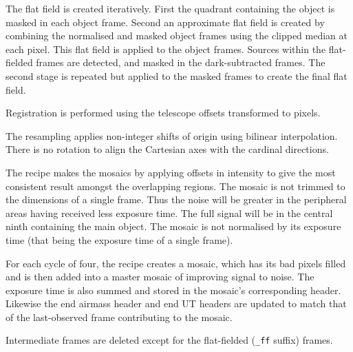 \documentclass[twoside,11pt,nolof]{starlink}
\begin{document}
{{{         \sstitem
         The flat field is created iteratively.  First the quadrant
         containing the object is masked in each object frame.  Second an
         approximate flat field is created by combining the normalised
         and masked object frames using the clipped median at each pixel.
         This flat field is applied to the object frames.  Sources within
         the flat-fielded frames are detected, and masked in the
         dark-subtracted frames.  The second stage is repeated but applied
         to the masked frames to create the final flat field.

         \sstitem
         Registration is performed using the telescope offsets
         transformed to pixels.

         \sstitem
         The resampling applies non-integer shifts of origin using
         bilinear interpolation.  There is no rotation to align the
         Cartesian axes with the cardinal directions.

         \sstitem
         The recipe makes the mosaics by applying offsets in intensity
         to give the most consistent result amongst the overlapping regions.
         The mosaic is not trimmed to the dimensions of a single frame.  Thus
         the noise will be greater in the peripheral areas having received
         less exposure time.  The full signal will be in the central ninth
         containing the main object.  The mosaic is not normalised by its
         exposure time (that being the exposure time of a single frame).

         \sstitem
         For each cycle of four, the recipe creates a mosaic, which has
         its bad pixels filled and is then added into a master mosaic of
         improving signal to noise.  The exposure time is also summed and
         stored in the mosaic's corresponding header.  Likewise the end
         airmass header and end UT headers are updated to match that of
         the last-observed frame contributing to the mosaic.

         \sstitem
         Intermediate frames are deleted except for the flat-fielded ({\tt\_ff}
         suffix) frames.
      }
   }
   }
\end{document}
